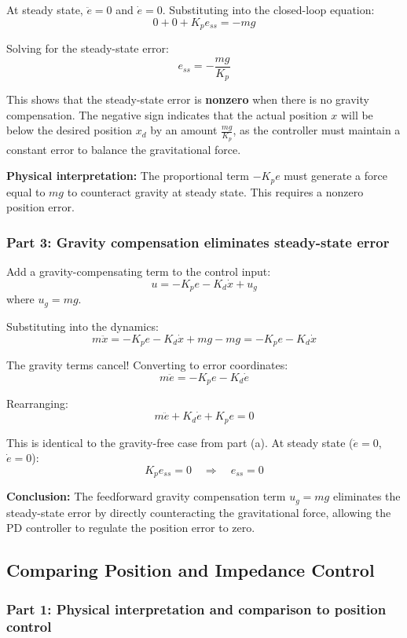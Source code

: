 \documentclass[11pt]{article}
\begin{document}
At steady state, $\ddot{e} = 0$ and $\dot{e} = 0$. Substituting into the closed-loop equation:
\[
0 + 0 + K_p e_{ss} = -mg
\]

Solving for the steady-state error:
\[
\boxed{e_{ss} = -\frac{mg}{K_p}}
\]

This shows that the steady-state error is \textbf{nonzero} when there is no gravity compensation. The negative sign indicates that the actual position $x$ will be below the desired position $x_d$ by an amount $\frac{mg}{K_p}$, as the controller must maintain a constant error to balance the gravitational force.

\textbf{Physical interpretation:} The proportional term $-K_p e$ must generate a force equal to $mg$ to counteract gravity at steady state. This requires a nonzero position error.

\subsubsection*{Part 3: Gravity compensation eliminates steady-state error}

Add a gravity-compensating term to the control input:
\[
u = -K_p e - K_d \dot{x} + u_g
\]
where $u_g = mg$.

Substituting into the dynamics:
\[
m\ddot{x} = -K_p e - K_d \dot{x} + mg - mg = -K_p e - K_d \dot{x}
\]

The gravity terms cancel! Converting to error coordinates:
\[
m\ddot{e} = -K_p e - K_d \dot{e}
\]

Rearranging:
\[
\boxed{m\ddot{e} + K_d \dot{e} + K_p e = 0}
\]

This is identical to the gravity-free case from part (a). At steady state ($\ddot{e} = 0$, $\dot{e} = 0$):
\[
K_p e_{ss} = 0 \quad \Rightarrow \quad \boxed{e_{ss} = 0}
\]

\textbf{Conclusion:} The feedforward gravity compensation term $u_g = mg$ eliminates the steady-state error by directly counteracting the gravitational force, allowing the PD controller to regulate the position error to zero.

\subsection{Comparing Position and Impedance Control}
\subsubsection*{Part 1: Physical interpretation and comparison to position control}
\end{document}
